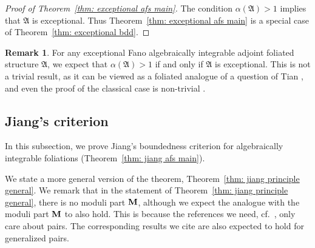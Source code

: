 \documentclass[11pt,reqno]{amsart}
\numberwithin{equation}{section}
\newcommand{\Mm}{{\bf{M}}}
\newcommand{\Aa}{{\mathfrak{A}}}
\theoremstyle{definition}
\newtheorem{rem}[thm]{Remark}
\begin{document}
\begin{proof}[Proof of Theorem~\ref{thm: exceptional afs main}]
 The condition $\alpha(\Aa)>1$ implies that $\Aa$ is exceptional. Thus Theorem~\ref{thm: exceptional afs main} is a special case of Theorem~\ref{thm: exceptional bdd}.
\end{proof}

\begin{rem}
For any exceptional Fano algebraically integrable adjoint foliated structure $\Aa$, we expect that $\alpha(\Aa)>1$ if and only if $\Aa$ is exceptional. This is not a trivial result, as it can be viewed as a foliated analogue of a question of Tian \cite[Question~1]{Tia90}, and even the proof of the classical case is non-trivial \cite[Theorem~1.7]{Bir21a}.
\end{rem}

\subsection{Jiang's criterion}

In this subsection, we prove Jiang's boundedness criterion for algebraically integrable foliations (Theorem~\ref{thm: jiang afs main}).

We state a more general version of the theorem, Theorem~\ref{thm: jiang principle general}. We remark that in the statement of Theorem~\ref{thm: jiang principle general}, there is no moduli part $\Mm$, although we expect the analogue with the moduli part $\Mm$ to also hold. This is because the references we need, cf.~\cite{LLX20,XZ21,XZ24}, only care about pairs. The corresponding results we cite are also expected to hold for generalized pairs.
\end{document}
